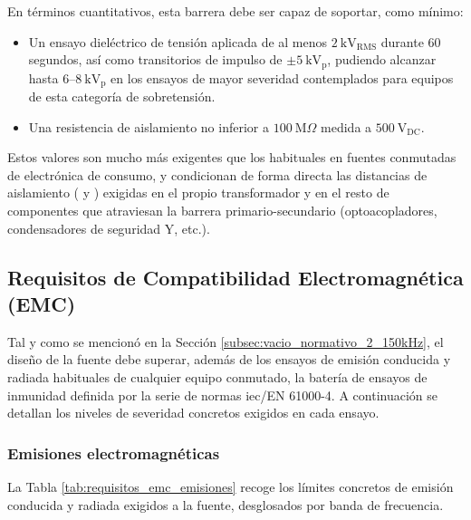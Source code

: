 En términos cuantitativos, esta barrera debe ser capaz de soportar, como mínimo:
\begin{itemize}
    \item Un ensayo dieléctrico de tensión aplicada de al menos $2\ \text{kV}_{\text{RMS}}$ durante 60 segundos, así como transitorios de impulso de $\pm 5\ \text{kV}_{\text{p}}$, pudiendo alcanzar hasta $6$--$8\ \text{kV}_{\text{p}}$ en los ensayos de mayor severidad contemplados para equipos de esta categoría de sobretensión.
    \item Una resistencia de aislamiento no inferior a $100\ \text{M}\Omega$ medida a $500\ \text{V}_{\text{DC}}$.
\end{itemize}

Estos valores son mucho más exigentes que los habituales en fuentes conmutadas de electrónica de consumo, y condicionan de forma directa las distancias de aislamiento (\textit{} y \textit{}) exigidas en el propio transformador y en el resto de componentes que atraviesan la barrera primario-secundario (optoacopladores, condensadores de seguridad Y, etc.).

\subsection{Requisitos de Compatibilidad Electromagnética (EMC)}
\label{subsec:requisitos_emc_psu}

Tal y como se mencionó en la Sección \ref{subsec:vacio_normativo_2_150kHz}, el diseño de la fuente debe superar, además de los ensayos de emisión conducida y radiada habituales de cualquier equipo conmutado, la batería de ensayos de inmunidad definida por la serie de normas \gls{iec}/EN 61000-4. A continuación se detallan los niveles de severidad concretos exigidos en cada ensayo.

\subsubsection*{Emisiones electromagnéticas}

La Tabla \ref{tab:requisitos_emc_emisiones} recoge los límites concretos de emisión conducida y radiada exigidos a la fuente, desglosados por banda de frecuencia.

